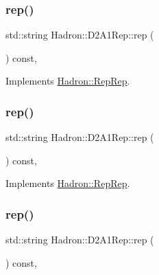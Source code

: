 \subsubsection{\texorpdfstring{rep()}{rep()}\hspace{0.1cm}{\footnotesize\ttfamily [3/5]}}
{\footnotesize\ttfamily std\+::string Hadron\+::\+D2\+A1\+Rep\+::rep (\begin{DoxyParamCaption}{ }\end{DoxyParamCaption}) const\hspace{0.3cm}{\ttfamily [inline]}, {\ttfamily [virtual]}}



Implements \mbox{\hyperlink{structHadron_1_1RepRep_ab3213025f6de249f7095892109575fde}{Hadron\+::\+Rep\+Rep}}.

\mbox{\label{structHadron_1_1D2A1Rep_ad489cd29126b2c555a38bb2a5545b2b4}} 
\subsubsection{\texorpdfstring{rep()}{rep()}\hspace{0.1cm}{\footnotesize\ttfamily [4/5]}}
{\footnotesize\ttfamily std\+::string Hadron\+::\+D2\+A1\+Rep\+::rep (\begin{DoxyParamCaption}{ }\end{DoxyParamCaption}) const\hspace{0.3cm}{\ttfamily [inline]}, {\ttfamily [virtual]}}



Implements \mbox{\hyperlink{structHadron_1_1RepRep_ab3213025f6de249f7095892109575fde}{Hadron\+::\+Rep\+Rep}}.

\mbox{\label{structHadron_1_1D2A1Rep_ad489cd29126b2c555a38bb2a5545b2b4}} 
\subsubsection{\texorpdfstring{rep()}{rep()}\hspace{0.1cm}{\footnotesize\ttfamily [5/5]}}
{\footnotesize\ttfamily std\+::string Hadron\+::\+D2\+A1\+Rep\+::rep (\begin{DoxyParamCaption}{ }\end{DoxyParamCaption}) const\hspace{0.3cm}{\ttfamily [inline]}, {\ttfamily [virtual]}}



